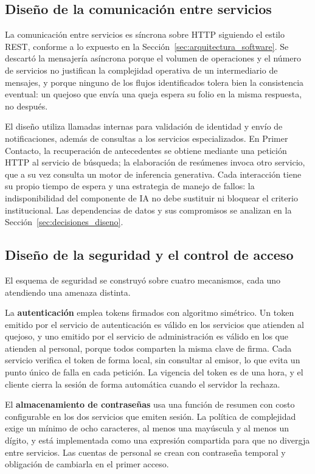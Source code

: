 	\subsection{Diseño de la comunicación entre servicios}
	La comunicación entre servicios es síncrona sobre HTTP siguiendo el estilo REST, conforme a lo
	expuesto en la Sección~\ref{sec:arquitectura_software}. Se descartó la mensajería asíncrona
	porque el volumen de operaciones y el número de servicios no justifican la complejidad operativa
	de un intermediario de mensajes, y porque ninguno de los flujos identificados tolera bien la
	consistencia eventual: un quejoso que envía una queja espera su folio en la misma respuesta, no
	después.
	
	El diseño utiliza llamadas internas para validación de identidad y envío de notificaciones,
	además de consultas a los servicios especializados. En Primer Contacto, la recuperación de
	antecedentes se obtiene mediante una petición HTTP al servicio de búsqueda; la elaboración de
	resúmenes invoca otro servicio, que a su vez consulta un motor de inferencia generativa.
	Cada interacción tiene su propio tiempo de espera y una estrategia de manejo de fallos: la
	indisponibilidad del componente de IA no debe sustituir ni bloquear el criterio institucional.
	Las dependencias de datos y sus compromisos se analizan en la
	Sección~\ref{sec:decisiones_diseno}.
	
	\subsection{Diseño de la seguridad y el control de acceso}
	El esquema de seguridad se construyó sobre cuatro mecanismos, cada uno atendiendo una amenaza
	distinta.
	
	La \textbf{autenticación} emplea tokens firmados con algoritmo simétrico. Un token emitido por
	el servicio de autenticación es válido en los servicios que atienden al quejoso, y uno emitido
	por el servicio de administración es válido en los que atienden al personal, porque todos
	comparten la misma clave de firma. Cada servicio verifica el token de forma local, sin consultar
	al emisor, lo que evita un punto único de falla en cada petición. La vigencia del token es de
	una hora, y el cliente cierra la sesión de forma automática cuando el servidor la rechaza.
	
	El \textbf{almacenamiento de contraseñas} usa una función de resumen con costo configurable en
	los dos servicios que emiten sesión. La política de complejidad exige un mínimo de ocho
	caracteres, al menos una mayúscula y al menos un dígito, y está implementada como una expresión
	compartida para que no divergja entre servicios. Las cuentas de personal se crean con contraseña
	temporal y obligación de cambiarla en el primer acceso.
	
